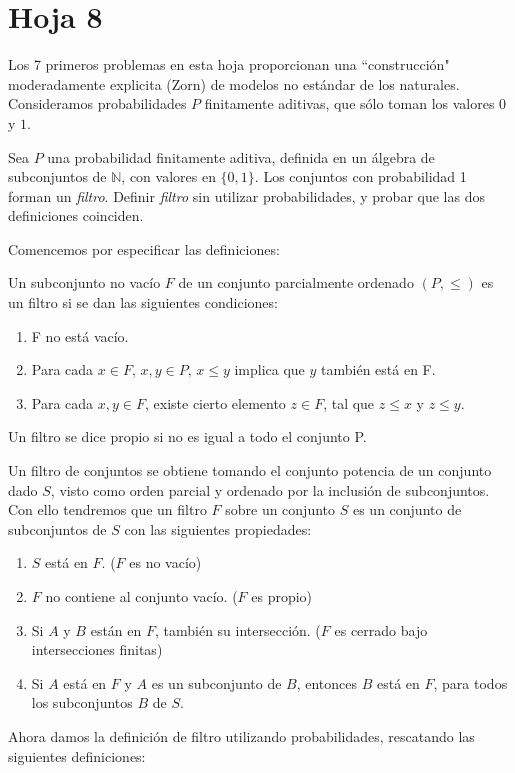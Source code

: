 \section{Hoja 8}
Los 7  primeros problemas en esta hoja proporcionan una ``construcción" moderadamente explicita (Zorn) de modelos
no estándar de los naturales. Consideramos probabilidades $P$ finitamente aditivas, que sólo toman los valores
$0$ y $1$.

\begin{problem}
Sea $P$ una probabilidad finitamente aditiva, definida en un álgebra de subconjuntos de $\mathbb{N}$,
con valores en $\{0,1\}$. Los conjuntos con probabilidad 1 forman un {\em filtro}. Definir {\em filtro} sin utilizar
probabilidades, y probar que las dos definiciones coinciden.

\solution

Comencemos por especificar las definiciones:

\begin{defn}[Filtro]\label{filtro}

Un subconjunto no vacío $F$ de un conjunto parcialmente ordenado $(P,≤)$ es un filtro si se dan las siguientes condiciones: %
\begin{enumerate}
\item F no está vacío.
\item Para cada $x \in F$, $x,y \in P$, $x ≤ y$ implica que $y$ también está en F.
\item Para cada $x, y \in F$, existe cierto elemento $z \in F$, tal que $z ≤ x$ y $z ≤ y$.
\end{enumerate}
Un filtro se dice propio si no es igual a todo el conjunto P.
\end{defn}

\begin{defn}

Un filtro de conjuntos se obtiene tomando el conjunto potencia de un conjunto dado $S$, visto como orden parcial y ordenado por la inclusión de subconjuntos. Con ello tendremos que un filtro $F$ sobre un conjunto $S$ es un conjunto de subconjuntos de $S$ con las siguientes propiedades:

\begin{enumerate}
\item $S$ está en $F$. ($F$ es no vacío)
\item $F$ no contiene al conjunto vacío. ($F$ es propio)
\item Si $A$ y $B$ están en $F$, también su intersección. ($F$ es cerrado bajo intersecciones finitas)
\item Si $A$ está en $F$ y $A$ es un subconjunto de $B$, entonces $B$ está en $F$, para todos los subconjuntos $B$ de $S$. %
\end{enumerate}
\end{defn}
Ahora damos la definición de filtro utilizando probabilidades, rescatando las siguientes definiciones:


\end{problem}
